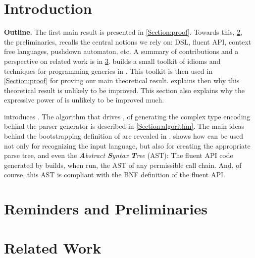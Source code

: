 \documentclass[a4paper,USenglish]{lipics}
\author{Anonymized for the submission}
\begin{document}
\maketitle
\begin{abstract}
  
\end{abstract}

\section{Introduction}


\textbf{Outline.}
The first main result is presented in \cref{Section:proof}.
Towards this,  \cref{Section:preliminaries}, the preliminaries, 
  recalls the central notions we rely on: DSL, fluent API,
  context free languages, pushdown automaton, etc. 
A summary of contributions and a perspective on related work is
  in \cref{Section:related}.
 builds a small toolkit of idioms and techniques
  for programming generics in \Java.
This toolkit is then used in \cref{Section:proof} for
  proving our main theoretical result.
 explains then why
  this theoretical result is unlikely to be improved.
This section also explains why the expressive power of \Self
  is unlikely to be improved much.

 introduces \Self.
The algorithm that drives \Self, of generating the complex
  type encoding behind the parser generator
  is described in \cref{Section:algorithm}.
The main ideas behind the bootstrapping definition of \Self
  are revealed in .
 shows how \Self can be used not only
  for recognizing the input language,
  but also for creating the appropriate parse tree, and even the \emph{\textbf Abstract \textbf Syntax \textbf Tree} (AST):
  The fluent API code generated by \Self builds,
    when run, the AST of any permissible call chain.
    And, of course, this AST is compliant with the BNF definition
      of the fluent API.

\section{Reminders and Preliminaries}
\label{Section:preliminaries}


\section{Related Work}
\label{Section:related}

\end{document}
